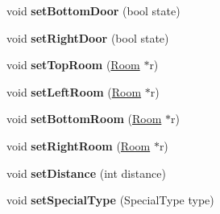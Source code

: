 \begin{DoxyCompactItemize}
\item 
\hypertarget{class_room_a6bd75cbe373514583b67b6131e484814}{void {\bfseries set\+Bottom\+Door} (bool state)}\label{class_room_a6bd75cbe373514583b67b6131e484814}

\item 
\hypertarget{class_room_a5ba5a9b9807f26d2ea17c8b9377214af}{void {\bfseries set\+Right\+Door} (bool state)}\label{class_room_a5ba5a9b9807f26d2ea17c8b9377214af}

\item 
\hypertarget{class_room_afebd779422904d4df29218a775daefb7}{void {\bfseries set\+Top\+Room} (\hyperlink{class_room}{Room} $\ast$r)}\label{class_room_afebd779422904d4df29218a775daefb7}

\item 
\hypertarget{class_room_a2100c62dc850c1d78c5ef67529e785a8}{void {\bfseries set\+Left\+Room} (\hyperlink{class_room}{Room} $\ast$r)}\label{class_room_a2100c62dc850c1d78c5ef67529e785a8}

\item 
\hypertarget{class_room_a0b30444583aafef29a6d4a87d4be92c4}{void {\bfseries set\+Bottom\+Room} (\hyperlink{class_room}{Room} $\ast$r)}\label{class_room_a0b30444583aafef29a6d4a87d4be92c4}

\item 
\hypertarget{class_room_a732ac8a1e1f0913a984e16fe699e790e}{void {\bfseries set\+Right\+Room} (\hyperlink{class_room}{Room} $\ast$r)}\label{class_room_a732ac8a1e1f0913a984e16fe699e790e}

\item 
\hypertarget{class_room_a8515625370a9aec953f76efded718e4b}{void {\bfseries set\+Distance} (int distance)}\label{class_room_a8515625370a9aec953f76efded718e4b}

\item 
\hypertarget{class_room_a5c58b28fceef732f7cf3f865209ab847}{void {\bfseries set\+Special\+Type} (Special\+Type type)}\label{class_room_a5c58b28fceef732f7cf3f865209ab847}

\end{DoxyCompactItemize}
